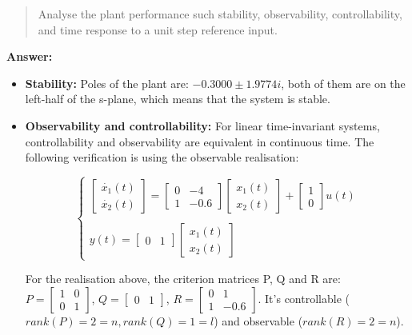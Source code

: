 \documentclass[12pt, oneside]{article}
\begin{document}
\begin{quote}    
Analyse the plant performance such stability, observability, controllability, and time response to a unit step reference input.
\end{quote}
\textbf{Answer:}
\begin{itemize}
    \item \textbf{Stability:}
    Poles of the plant are: $-0.3000\pm1.9774i$, both of them are on the left-half of the s-plane, which means that the system is stable.
    \item \textbf{Observability and controllability:} For linear time-invariant systems, controllability and observability are equivalent in continuous time\cite{ControlandObserve}. The following verification is using the observable realisation\cite{CourseMaterial}:

    \begin{equation}
        \begin{cases}
        \left[\begin{array}{ccc}\dot{x_1}(t)\\
        \dot{x_{2}}(t)\end{array}\right]
        =
        \left[\begin{array}{ccc} 0&-4\\
        1&-0.6\end{array}\right]
        \left[\begin{array}{ccc}x_1(t)\\
        x_2(t)\end{array}\right]
        +
        \left[\begin{array}{ccc}1\\
        0\end{array}\right]
        u(t)
        \\
        \\
        y(t)=
        \left[\begin{array}{ccc}0&1\end{array}\right]
        \left[\begin{array}{ccc}x_1(t)\\
        x_2(t)\end{array}\right]
        \end{cases}
    \end{equation}

    For the realisation above, the criterion matrices P, Q and R are:
    $P = \left[\begin{array}{ccc}1&0\\
        0&1\end{array}\right]$, $Q = \left[\begin{array}{ccc}0&1\end{array}\right]$, $R=\left[\begin{array}{ccc}0&1\\
        1&-0.6\end{array}\right]$. It's controllable ($rank(P)=2=n, rank(Q)=1=l$) and observable ($rank(R)=2=n$).


\end{itemize}
\end{document}
